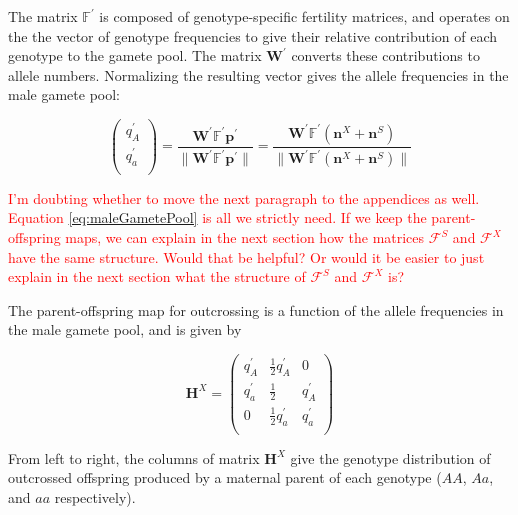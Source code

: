 \documentclass[11pt]{article}
\def\mbf#1{\mathbf{#1}}
\def\mbb#1{\mathbb{#1}}
\def\mcal#1{\mathcal{#1}}
\begin{document}
\noindent The matrix $\mbb{F}^{\prime}$ is composed of genotype-specific fertility matrices, and operates on the the vector of genotype frequencies to give their relative contribution of each genotype to the gamete pool. The matrix $\mbf{W}^{\prime}$ converts these contributions to allele numbers. Normalizing the resulting vector gives the allele frequencies in the male gamete pool:
\begin{linenomath*}
\begin{equation} \label{eq:maleGametePool}
	\left(
		\begin{array}{c}
			q^{\prime}_{A} \\
			q^{\prime}_{a} \\
		\end{array} \right) = 
			\frac{\mbf{W}^{\prime} \mbb{F}^{\prime} \mbf{p}^{\prime}}{\| \mbf{W}^{\prime} \mbb{F}^{\prime} \mbf{p}^{\prime} \|} = 
				\frac{\mbf{W}^{\prime} \mbb{F}^{\prime} (\mbf{n}^X + \mbf{n}^S)}{\| \mbf{W}^{\prime} \mbb{F}^{\prime} (\mbf{n}^X + \mbf{n}^S)\|}
\end{equation}
\end{linenomath*}

\textcolor{red}{
I'm doubting whether to move the next paragraph to the appendices as well.  Equation \ref{eq:maleGametePool} is all we strictly need. If we keep the parent-offspring maps, we can explain in the next section how the matrices 
$\mcal{F}^S$ and $\mcal{F}^X$ have the same structure. Would that be helpful? Or would it be easier to just explain in the next section what the structure of $\mcal{F}^S$ and $\mcal{F}^X$ is? }

The parent-offspring map for outcrossing is a function of the allele frequencies in the male gamete pool, and is given by 
\begin{linenomath*}
\begin{equation} \label{eq:HX}
	\mbf{H}^X = 
			\left(
			\begin{array}{ccc}
				q^{\prime}_{A} & \frac{1}{2} q^{\prime}_{A} & 0 \\
				q^{\prime}_{a} & \frac{1}{2} & q^{\prime}_{A}  \\
				0 & \frac{1}{2} q^{\prime}_{a} & q^{\prime}_{a} \\
			\end{array} \right)
\end{equation}
\end{linenomath*}
\noindent From left to right, the columns of matrix $\mbf{H}^X$ give the genotype distribution of outcrossed offspring produced by a maternal parent of each genotype ($AA$, $Aa$, and $aa$ respectively).
\end{document}
